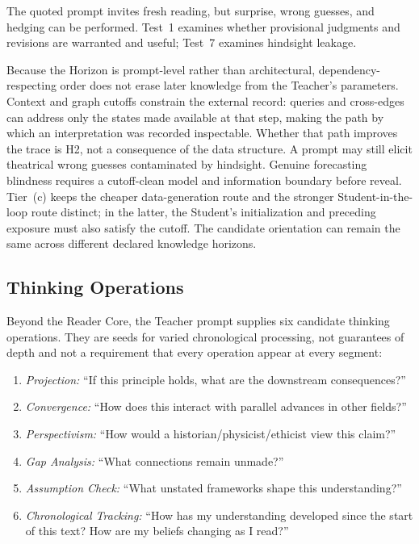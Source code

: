 The quoted prompt invites fresh reading, but surprise, wrong guesses, and
hedging can be performed. Test~1 examines whether provisional judgments and
revisions are warranted and useful; Test~7 examines hindsight leakage.

Because the Horizon is prompt-level rather than architectural,
dependency-respecting order does not erase later knowledge from the Teacher's
parameters. Context and graph cutoffs constrain the external record: queries
and cross-edges can address only the states made available at that step,
making the path by which an interpretation was recorded inspectable. Whether
that path improves the trace is H2, not a consequence of the data structure.
A prompt may still elicit theatrical wrong guesses contaminated by hindsight.
Genuine forecasting blindness requires a cutoff-clean model and information
boundary before reveal. Tier~(c) keeps the cheaper data-generation route and
the stronger Student-in-the-loop route distinct; in the latter, the Student's
initialization and preceding exposure must also satisfy the cutoff. The candidate orientation can remain the same across different declared
knowledge horizons.


\subsection{Thinking Operations}

Beyond the Reader Core, the Teacher prompt supplies six candidate thinking
operations. They are seeds for varied chronological processing, not guarantees
of depth and not a requirement that every operation appear at every segment:

\begin{enumerate}
    \item \emph{Projection:} ``If this principle holds, what are the downstream consequences?''
    \item \emph{Convergence:} ``How does this interact with parallel advances in other fields?''
    \item \emph{Perspectivism:} ``How would a historian/physicist/ethicist view this claim?''
    \item \emph{Gap Analysis:} ``What connections remain unmade?''
    \item \emph{Assumption Check:} ``What unstated frameworks shape this understanding?''
    \item \emph{Chronological Tracking:} ``How has my understanding developed since the start of this text? How are my beliefs changing as I read?''
\end{enumerate}

